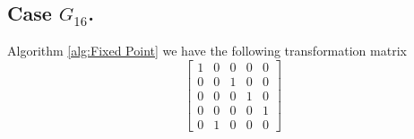 \documentclass{article}
\theoremstyle{plain}
\theoremstyle{definition}
\newcommand{\tand}{\ensuremath{\,\,\, \text{and} \,\,\,}}
\begin{document}
\subsection{Case $G_{16}$.}
Algorithm \ref{alg:Fixed Point} we have the following transformation matrix 
$$
 \left[ \begin {array}{ccccc} 1&0&0&0&0\\ 0&0&1&0&0
\\ 0&0&0&1&0\\ 0&0&0&0&1
\\ 0&1&0&0&0\end {array} \right] 
$$
\end{document}
